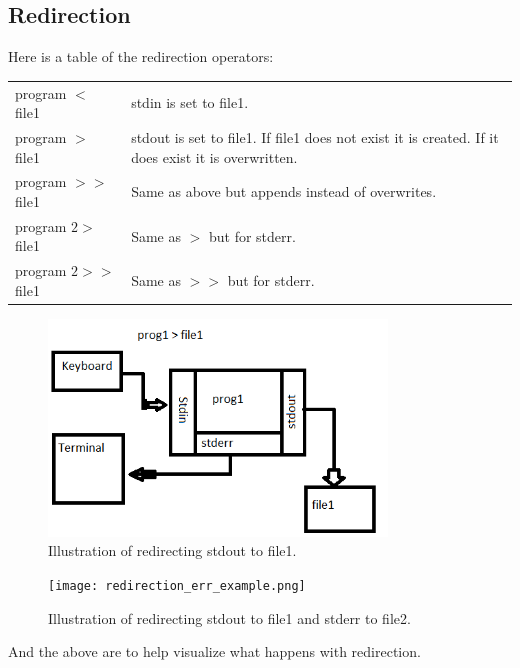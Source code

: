 \documentclass[oneside]{book}
\begin{document}
    \subsection{Redirection}
        Here is a table of the redirection operators:
        \begin{center}
            \begin{tabular}{|l|l|}
                 \hline
                 program $<$ file1 & stdin is set to file1. \\
                 program $>$ file1 & stdout is set to file1. If file1 does not exist it is created. If it does exist it is overwritten. \\
                 program $>>$ file1 & Same as above but appends instead of overwrites. \\
                 program $2>$ file1 & Same as $>$ but for stderr. \\
                 program $2>>$ file1 & Same as $>>$ but for stderr. \\ \hline
            \end{tabular}
        \end{center}
        \begin{figure}[ht!]
	        \centering
	        \includegraphics[width=90mm]{redirection_out_example.png}
	        \caption{Illustration of redirecting stdout to file1.} 
        \end{figure}  
        \begin{figure}[ht!]
	        \centering
	        \texttt{[image: redirection\_err\_example.png]}
	        \caption{Illustration of redirecting stdout to file1 and stderr to file2.} 
        \end{figure}
        And the above are to help visualize what happens with redirection.
        
\end{document}
